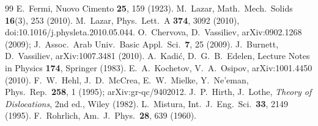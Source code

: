 \documentclass[12pt,a4paper]{article}
\begin{document}
\begin{thebibliography}{99}
 E.~Fermi, Nuovo Cimento \textbf{25}, 159 (1923).
 M.~Lazar, Math.\ Mech.\ Solids \textbf{16}(3), 253 (2010).
 M.~Lazar, Phys.\ Lett.\ A \textbf{374}, 3092 (2010), doi:10.1016/j.physleta.2010.05.044.
 O.~Chervova, D.~Vassiliev, arXiv:0902.1268 (2009); J.\ Assoc.\ Arab Univ.\ Basic Appl.\ Sci.\ \textbf{7}, 25 (2009).
 J.~Burnett, D.~Vassiliev, arXiv:1007.3481 (2010).
 A.~Kadi\'c, D.~G.~B.~Edelen, Lecture Notes in Physics \textbf{174}, Springer (1983).
 E.~A.~Kochetov, V.~A.~Osipov, arXiv:1001.4450 (2010).
 F.~W.~Hehl, J.~D.~McCrea, E.~W.~Mielke, Y.~Ne'eman, Phys.\ Rep.\ \textbf{258}, 1 (1995); arXiv:gr-qc/9402012.
 J.~P.~Hirth, J.~Lothe, \emph{Theory of Dislocations}, 2nd ed., Wiley (1982).
 L.~Mistura, Int.\ J.\ Eng.\ Sci.\ \textbf{33}, 2149 (1995).
 F.~Rohrlich, Am.\ J.\ Phys.\ \textbf{28}, 639 (1960).
\end{thebibliography}
\end{document}
